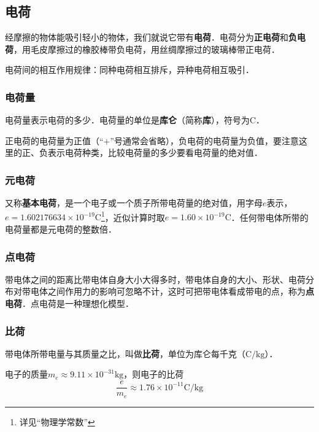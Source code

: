 
\subsection{电荷}

经摩擦的物体能吸引轻小的物体，我们就说它带有\textbf{电荷}．电荷分为\textbf{正电荷}和\textbf{负电荷}，用毛皮摩擦过的橡胶棒带负电荷，用丝绸摩擦过的玻璃棒带正电荷．

电荷间的相互作用规律：同种电荷相互排斥，异种电荷相互吸引．

\subsubsection{电荷量}

电荷量表示电荷的多少．电荷量的单位是\textbf{库仑}（简称\textbf{库}），符号为$\mathrm{C}$．

正电荷的电荷量为正值（“$+$”号通常会省略），负电荷的电荷量为负值，要注意这里的正、负表示电荷种类，比较电荷量的多少要看电荷量的绝对值．

\subsubsection{元电荷}

又称\textbf{基本电荷}，是一个电子或一个质子所带电荷量的绝对值，用字母$e$表示，$e = 1.602176634 \times 10^{-19} \mathrm{C}$\footnote{详见“物理学常数”}，近似计算时取$e = 1.60 \times 10^{-19} \mathrm{C}$．任何带电体所带的电荷量都是元电荷的整数倍．

\subsubsection{点电荷}

带电体之间的距离比带电体自身大小大得多时，带电体自身的大小、形状、电荷分布对带电体之间作用力的影响可忽略不计，这时可把带电体看成带电的点，称为\textbf{点电荷}．点电荷是一种理想化模型．

\subsubsection{比荷}

带电体所带电量与其质量之比，叫做\textbf{比荷}，单位为库仑每千克（$\mathrm{C/kg}$）．

电子的质量$m_e \approx 9.11 \times 10^{-31} \mathrm{kg}$，则电子的比荷
\begin{equation}
\frac{e}{m_e} \approx 1.76 \times 10^{-11} \mathrm{C/kg}
\end{equation}

